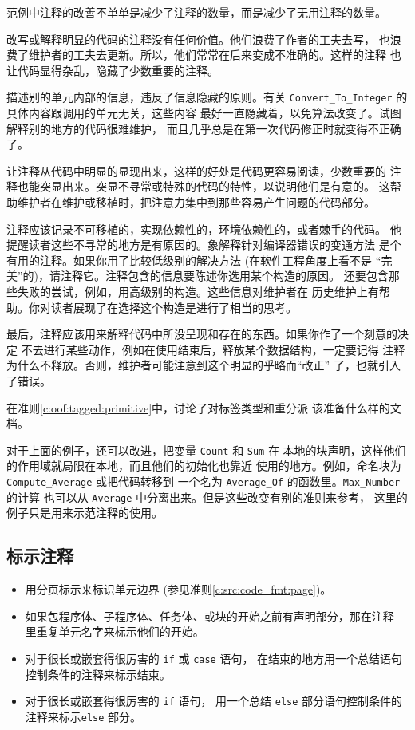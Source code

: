 \begin{blockindent}
范例中注释的改善不单单是减少了注释的数量，而是减少了无用注释的数量。

改写或解释明显的代码的注释没有任何价值。他们浪费了作者的工夫去写，
也浪费了维护者的工夫去更新。所以，他们常常在后来变成不准确的。这样的注释
也让代码显得杂乱，隐藏了少数重要的注释。

描述别的单元内部的信息，违反了信息隐藏的原则。有关
\texttt{Convert\_To\_Integer} 的具体内容跟调用的单元无关，这些内容
最好一直隐藏着，以免算法改变了。试图解释别的地方的代码很难维护，
而且几乎总是在第一次代码修正时就变得不正确了。

让注释从代码中明显的显现出来，这样的好处是代码更容易阅读，少数重要的
注释也能突显出来。突显不寻常或特殊的代码的特性，以说明他们是有意的。
这帮助维护者在维护或移植时，把注意力集中到那些容易产生问题的代码部分。

注释应该记录不可移植的，实现依赖性的，环境依赖性的，或者棘手的代码。
他提醒读者这些不寻常的地方是有原因的。象解释针对编译器错误的变通方法
是个有用的注释。如果你用了比较低级别的解决方法 (在软件工程角度上看不是
``完美''的)，请注释它。注释包含的信息要陈述你选用某个构造的原因。
还要包含那些失败的尝试，例如，用高级别的构造。这些信息对维护者在
历史维护上有帮助。你对读者展现了在选择这个构造是进行了相当的思考。

最后，注释应该用来解释代码中所没呈现和存在的东西。如果你作了一个刻意的决定
不去进行某些动作，例如在使用结束后，释放某个数据结构，一定要记得
注释为什么不释放。否则，维护者可能注意到这个明显的乎略而``改正''
了，也就引入了错误。

在准则\ref{c:oof:tagged:primitive}中，讨论了对标签类型和重分派
该准备什么样的文档。
\end{blockindent}

\begin{blockindent}
对于上面的例子，还可以改进，把变量 \texttt{Count} 和 \texttt{Sum} 在
本地的块声明，这样他们的作用域就局限在本地，而且他们的初始化也靠近
使用的地方。例如，命名块为 \texttt{Compute\_Average} 或把代码转移到
一个名为 \texttt{Average\_Of} 的函数里。\texttt{Max\_Number} 的计算
也可以从 \texttt{Average} 中分离出来。但是这些改变有别的准则来参考，
这里的例子只是用来示范注释的使用。
\end{blockindent}

\subsection{标示注释}
\begin{itemize}
\item 用分页标示来标识单元边界 (参见准则\ref{c:src:code_fmt:page})。
\item 如果包程序体、子程序体、任务体、或块的开始之前有声明部分，那在注释
里重复单元名字来标示他们的开始。
\item 对于很长或嵌套得很厉害的 \texttt{if} 或 \texttt{case} 语句，
在结束的地方用一个总结语句控制条件的注释来标示结束。
\item 对于很长或嵌套得很厉害的 \texttt{if} 语句，
用一个总结 \texttt{else} 部分语句控制条件的注释来标示\texttt{else} 部分。
\end{itemize}

